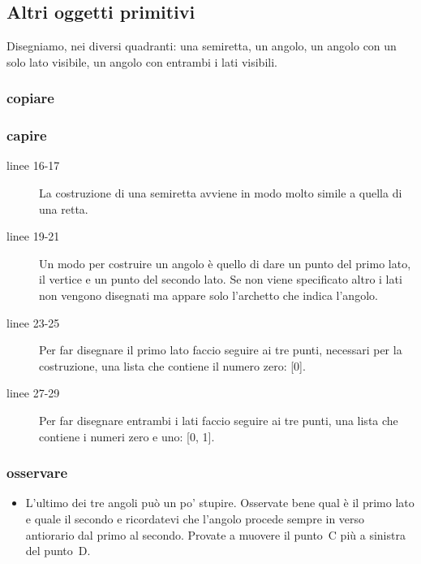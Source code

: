 \subsection{Altri oggetti primitivi}
\label{subsec:geo_int_altrioggetti}

Disegniamo, nei diversi quadranti: una semiretta, un angolo, un angolo con un 
solo lato visibile, un angolo con entrambi i lati visibili.

\subsubsection{copiare}



\subsubsection{capire}

\begin{description}
 \item [linee 16-17]
La costruzione di una semiretta avviene in modo molto simile a quella di una 
retta.
 \item [linee 19-21]
Un modo per costruire un angolo è quello di dare un punto del primo lato, il 
vertice e un punto del secondo lato. Se non viene specificato altro i lati 
non vengono disegnati ma appare solo l'archetto che indica l'angolo.
 \item [linee 23-25]
Per far disegnare il primo lato faccio seguire ai tre punti, necessari per la 
costruzione, una lista che contiene il numero zero: [0].
 \item [linee 27-29]
Per far disegnare entrambi i lati faccio seguire ai tre punti, una lista che 
contiene i numeri zero e uno: [0, 1].
\end{description}

\subsubsection{osservare}

\begin{itemize}
 \item L'ultimo dei tre angoli può un po' stupire. Osservate bene qual è 
il primo lato 
e quale il secondo e ricordatevi che l'angolo procede sempre in verso 
antiorario dal primo al secondo. Provate a muovere il punto~C più a sinistra 
del punto~D.
\end{itemize}

